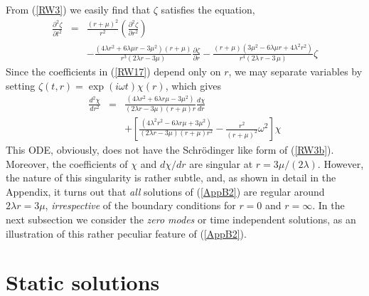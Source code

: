 \documentclass[12pt,aps,floats,showpacs,amssymb,tightenlines]{revtex4}
\begin{document}
 { } From (\ref{RW3}) we easily find that $\zeta$ satisfies the equation,
 \begin{eqnarray}
\label{RW17}
 {\frac {\partial ^{2} \zeta}{\partial {t}^{2}}} & = &
{\frac {   \left( r+\mu \right) ^{2}}{{r}^{2}}}\left( {\frac
{\partial^{2} \zeta}{\partial {r}^{2}}}  \right)   \nonumber \\ & &
-{\frac {\left( 4\lambda {r}^{2}+ 6 \lambda \mu r-3{\mu}^{2} \right)
\left( r+\mu
 \right)  }{{r}^
{3} \left( 2 \lambda r-3\mu \right) }}{\frac {\partial
\zeta}{\partial r}} -{\frac {
 \left( r+\mu \right)  \left( 3{\mu}^{2}- 6 \lambda \mu r+4 \lambda^2 {r}^{2}
 \right) }{{r}^{4} \left( 2 \lambda \,r-3\,\mu \right) }}\zeta
\end{eqnarray}
Since the coefficients in (\ref{RW17}) depend only on $r$, we may separate variables by
setting $\zeta(t,r)=\exp(i \omega t) \chi(r)$, which gives
\begin{eqnarray}
\label{AppB2}
{\frac {d^2 \chi}{d{r}^{2}}} & = &
 {\frac { \left(
4 \lambda {r}^{2}+6  \lambda r\mu -3{\mu}^{2} \right)  }{
 \left( 2  \lambda  r-3\mu \right)  \left( r+\mu
 \right) r}}{\frac {d \chi}{dr}} \nonumber \\ & &
+\left[{\frac { \left( 4{\lambda}^{2}{r}^{2}-6 \lambda
r\mu+3{\mu}^{2} \right)
  }{ \left( 2  \lambda  r-3\mu \right)
 \left( r+\mu \right) {r}^{2}}}  -\frac{r^2}{(r+\mu)^2}\omega^2 \right]{\chi}
\end{eqnarray}
This ODE, obviously, does not have the Schr\"odinger like form of
(\ref{RW3b}). Moreover, the coefficients of $\chi$ and $d \chi/dr$
are singular at $r=3 \mu /  (2 \lambda)$. However, the nature of
this singularity is rather subtle, and, as shown in detail in the
Appendix, it turns out that {\em all} solutions of (\ref{AppB2}) are
regular around $2 \lambda r=3\mu $, {\em irrespective} of the
boundary conditions for $r=0$ and $r=\infty$. In the next subsection
 we consider the {\em zero modes} or time independent solutions, as an illustration of this
 rather peculiar feature of (\ref{AppB2}).


\section{Static solutions}
\end{document}
